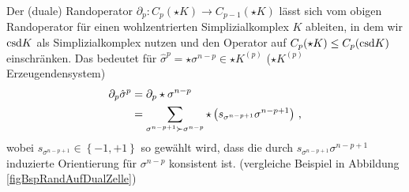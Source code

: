   \begin{folgerung}
    Der (duale) Randoperator \( \partial_{p}: C_{p}(\star K) \rightarrow C_{p-1}(\star K) \) lässt sich vom obigen Randoperator für einen wohlzentrierten Simplizialkomplex \( K \) ableiten, 
    in dem wir \( \text{csd} K \) als Simplizialkomplex nutzen und den Operator auf \( C_{p}(\star K) \le C_{p}(\text{csd} K) \) einschränken.
    Das bedeutet für \( \hat{\sigma}^{p} = \star\sigma^{n-p} \in \star K^{(p)} \) (\( \star K^{(p)} \) Erzeugendensystem)
    \begin{align}
      \partial_{p} \hat{\sigma}^{p} &= \partial_{p}\star\sigma^{n-p} \\
                                    &= \sum_{\sigma^{n-p+1} \succ \sigma^{n-p}} \star \left( s_{\sigma^{n-p+1}} \sigma^{n-p+1} \right) \,\text{,}
    \end{align}
    wobei \( s_{\sigma^{n-p+1}} \in \left\{ -1,+1 \right\} \) so gewählt wird, dass die durch \( s_{\sigma^{n-p+1}} \sigma^{n-p+1} \) induzierte Orientierung für
    \( \sigma^{n-p} \) konsistent ist. (vergleiche Beispiel in Abbildung \ref{figBspRandAufDualZelle})
  \end{folgerung}
